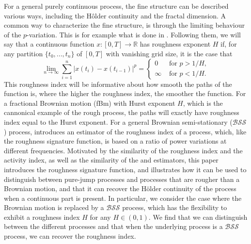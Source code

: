 \documentclass[fleqn,11pt,letterpaper]{article}
\theoremstyle{plain}
\theoremstyle{definition}
\theoremstyle{remark}
\numberwithin{equation}{section}
\begin{document}
For a general purely continuous process, the fine structure can be described various ways, including the Hôlder continuity and the fractal dimension. A common way to characterize the fine structure, is through the limiting behaviour of the $p$-variation. This is for example what is done in \cite{HanSchied2021}. Following them, we will say that a continuous function $x:[0,T]\to\mathbb{R}$ has roughness exponent $H$ if, for any partition $\{t_0,...,t_n\}$ of $[0,T]$ with vanishing grid size, it is the case that
\begin{equation}\label{eq:roughness_def}
    \lim_{n\to\infty}\sum_{i=1}^n\vert x(t_i) - x(t_{i-1})\vert^p= \begin{cases}0 & \text { for } p>1 / H, \\ \infty & \text { for } p<1 / H .\end{cases}
\end{equation}
This roughness index will be informative about how smooth the paths of the function is, where the higher the roughness index, the smoother the function. For a fractional Brownian motion (fBm) with Hurst exponent $H$, which is the cannonical example of the rough process, the paths will exactly have roughness index equal to the Hurst exponent. For a general Brownian semi-stationary ($\mathcal{BSS}$) process, \cite{Corcuera2013} introduces an estimator of the roughness index of a process, which, like the roughness signature function, is based on a ratio of power variations at different frequencies. Motivated by the similarity of the roughness index and the activity index, as well as the similarity of the \cite{Todorov2010} and \cite{Corcuera2013} estimators, this paper introduces the roughness signature function, and illustrates how it can be used to distinguish between pure-jump processes and processes that are rougher than a Brownian motion, and that it can recover the Hölder continuity of the process when a continuous part is present. In particular, we consider the case where the Brownian motion is replaced by a $\mathcal{BSS}$ process, which has the flexibility to exhibit a roughness index $H$ for any $H\in(0,1)$. We find that we can distinguish between the different processes and that when the underlying process is a $\mathcal{BSS}$ process, we can recover the roughness index. 
\end{document}
